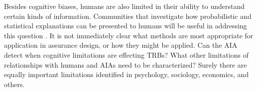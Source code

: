 Besides cognitive biases, humans are also limited in their ability to understand certain kinds of information. Communities that investigate how probabilistic and statistical explanations can be presented to humans will be useful in addressing this question \cite{Rouse1986-dz,Wallace2001-fm,Kuhn1997-qc,Lomas2012-ie,Swartout1983-ko}. It is not immediately clear what methods are most appropriate for application in assurance design, or how they might be applied. Can the AIA detect when cognitive limitations are effecting TRBs? What other limitations of relationships with humans and AIAs need to be characterized? Surely there are equally important limitations identified in psychology, sociology, economics, and others.




